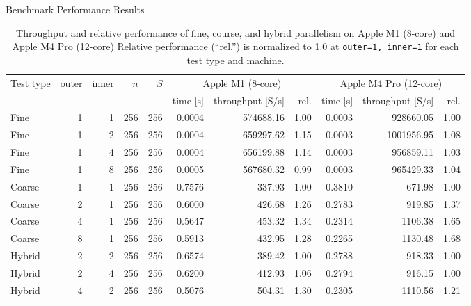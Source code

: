\documentclass{article}
\begin{document}
\begin{table}[H]
  \label{table1}
  \caption{Benchmark Performance Results}
  \centering
  \small
  \begin{tabular}{lrrrrrrrrrr}
    \toprule
    Test type &
    outer & inner & $n$ & $S$ &
    \multicolumn{3}{c}{Apple M1 (8-core)} &
    \multicolumn{3}{c}{Apple M4 Pro (12-core)} \\
    \cmidrule(lr){6-8}\cmidrule(lr){9-11}
     & & & & &
    time [s] & throughput [S/s] & rel. &
    time [s] & throughput [S/s] & rel. \\
    \midrule
    Fine    & 1 & 1 & 256 & 256 & 0.0004 & 574688.16 & 1.00 & 0.0003 & 928660.05 & 1.00 \\
    Fine    & 1 & 2 & 256 & 256 & 0.0004 & 659297.62 & 1.15 & 0.0003 &1001956.95 & 1.08 \\
    Fine    & 1 & 4 & 256 & 256 & 0.0004 & 656199.88 & 1.14 & 0.0003 & 956859.11 & 1.03 \\
    Fine   & 1 & 8 & 256 & 256 & 0.0005 & 567680.32 & 0.99 & 0.0003 & 965429.33 & 1.04 \\
    \midrule
    Coarse & 1 & 1 & 256 & 256 & 0.7576 &   337.93 & 1.00 & 0.3810 &   671.98 & 1.00 \\
    Coarse & 2 & 1 & 256 & 256 & 0.6000 &   426.68 & 1.26 & 0.2783 &   919.85 & 1.37 \\
    Coarse  & 4 & 1 & 256 & 256 & 0.5647 &   453.32 & 1.34 & 0.2314 &  1106.38 & 1.65 \\
    Coarse & 8 & 1 & 256 & 256 & 0.5913 &   432.95 & 1.28 & 0.2265 &  1130.48 & 1.68 \\
    \midrule
    Hybrid  & 2 & 2 & 256 & 256 & 0.6574 &   389.42 & 1.00 & 0.2788 &   918.33 & 1.00 \\
    Hybrid  & 2 & 4 & 256 & 256 & 0.6200 &   412.93 & 1.06 & 0.2794 &   916.15 & 1.00 \\
    Hybrid  & 4 & 2 & 256 & 256 & 0.5076 &   504.31 & 1.30 & 0.2305 &  1110.56 & 1.21 \\
    \bottomrule
  \end{tabular}
  \caption{Throughput and relative performance of fine,
           course, and hybrid parallelism on Apple M1 (8-core)
           and Apple M4 Pro (12-core) Relative performance (“rel.”) is normalized to 1.0 at \texttt{outer=1, inner=1} for each
           test type and machine.}
  \label{tab:hybrid-bench-m1-m4}
\end{table}
\end{document}
